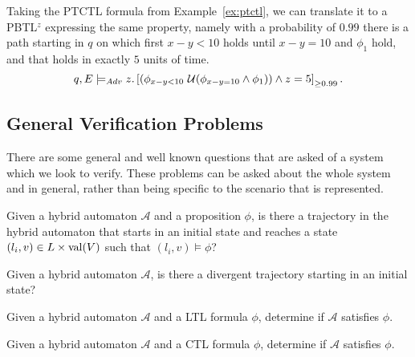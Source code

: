 \begin{ex}
Taking the PTCTL formula from Example~\ref{ex:ptctl}, we can translate it to a PBTL$^{z}$ expressing the same property, namely with a probability of $0.99$ there is a path starting in $q$ on which first $x-y<10$ holds until $x-y=10$ and $\phi_{1}$ hold, and that holds in exactly $5$ units of time.
\[
q,E\models_{Adv} z.\left[(\phi_{x-y<10}\ \mathcal{U}(\phi_{x-y=10}\land\phi_{1}))\land z=5\right]_{\geq0.99}.
\]
\end{ex}
\subsection{General Verification Problems}
There are some general and well known questions that are asked of a system which we look to verify.
These problems can be asked about the whole system and in general, rather than being specific to the scenario that is represented.

\begin{prob}
\label{prob:reach}
Given a hybrid automaton $\mathcal{A}$ and a proposition $\phi$, is there a trajectory in the hybrid automaton that starts in an initial state and reaches a state $(l_{i},v)\in L\times\operatorname{val}(V)$ such that $(l_{i},v)\models\phi$?
\end{prob}

\begin{prob}
\label{prob:empty}
Given a hybrid automaton $\mathcal{A}$, is there a divergent trajectory starting in an initial state?
\end{prob}


\begin{prob}
\label{prob:ltl}
Given a hybrid automaton $\mathcal{A}$ and a LTL formula $\phi$, determine if $\mathcal{A}$ satisfies $\phi$.
\end{prob}

\begin{prob}
\label{prob:ctl}
Given a hybrid automaton $\mathcal{A}$ and a CTL formula $\phi$, determine if $\mathcal{A}$ satisfies $\phi$.
\end{prob}
